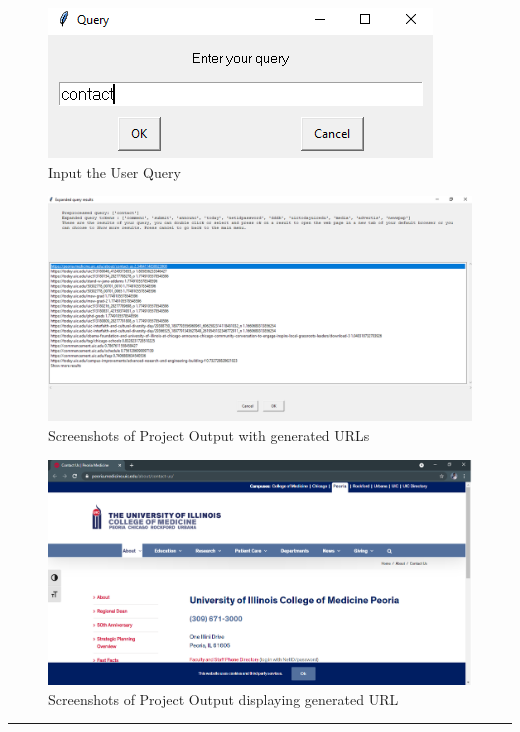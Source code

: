 \begin{figure}[h!]
    \begin{center}
        \includegraphics[scale=1]{res4}
        \caption{Input the User Query}
    \end{center}
\end{figure}
\begin{figure}[h!]
    \begin{center}
        \includegraphics[scale=0.4]{res5}
        \caption{Screenshots of Project Output with generated URLs}
    \end{center}
\end{figure}
\begin{figure}[h!]
    \begin{center}
        \includegraphics[scale=0.4]{res6}
        \caption{Screenshots of Project Output displaying generated URL}
    \end{center}
\end{figure}

\vspace{10mm}
\hrule

